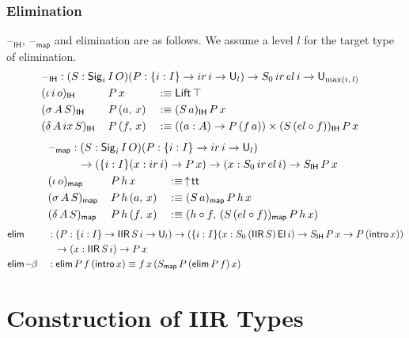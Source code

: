 \documentclass[acmsmall,screen,review,anonymous]{acmart}
\newcommand{\msf}[1]{{\mathsf{#1}}}
\newcommand{\U}{\msf{U}}
\newcommand{\El}{\msf{El}}
\newcommand{\Lift}{\msf{Lift}}
\newcommand{\lup}{\uparrow}
\newcommand{\Sig}{\msf{Sig}}
\newcommand{\ttt}{\msf{tt}}
\newcommand{\blank}{{\mathord{\hspace{1pt}\text{--}\hspace{1pt}}}}
\newcommand{\ir}{{ir}}
\newcommand{\el}{{el}}
\newcommand{\ix}{{ix}}
\newcommand{\intro}{\msf{intro}}
\newcommand{\IH}{\msf{IH}}
\newcommand{\map}{\msf{map}}
\newcommand{\elim}{\msf{elim}}
\newcommand{\IIR}{\msf{IIR}}
\begin{document}
\subsubsection{Elimination}\label{sec:iir-elimination} $\blank_\IH$, $\blank_\map$ and elimination are
as follows. We assume a level $l$ for the target type of elimination.
\begin{alignat*}{3}
  &\rlap{$\blank_\IH : (S : \Sig_i\,I\,O)(P : \{i : I\}\to \ir\,i \to \U_l) \to S_0\,\ir\,\el\,i \to \U_{\max(i,\,l)}$} \\
  &(\iota\,i\,o)_\IH \,&&P\,x       &&:\equiv \Lift\,\top \\
  &(\sigma\,A\,S)_\IH\,&&P\,(a,\,x) &&:\equiv (S\,a)_\IH\,P\,x \\
  &(\delta\,A\,\ix\,S)_\IH\,&&P\,(f,\,x) &&:\equiv ((a : A) \to P\,(f\,a)) \times (S\,(\el \circ f))_\IH\,P\,x
\end{alignat*}
\begin{alignat*}{3}
  &\hspace{-3em}\rlap{$\blank_\map : (S : \Sig_i\,I\,O)(P : \{i : I\}\to \ir\,i \to \U_l)$}\\
  &\hspace{-3em}\rlap{$\hspace{3em}\to (\{i : I\}(x : \ir\,i) \to P\,x) \to (x : S_0\,\ir\,\el\,i) \to S_\IH\,P\,x$} \\
  &\hspace{-3em}(\iota\,o)_\map    \,&&P\,h\,x       &&:\equiv\,\lup\!\ttt \\
  &\hspace{-3em}(\sigma\,A\,S)_\map\,&&P\,h\,(a,\,x) &&:\equiv (S\,a)_\map\,P\,h\,x \\
  &\hspace{-3em}(\delta\,A\,S)_\map\,&&P\,h\,(f,\,x) &&:\equiv (h \circ f,\,(S\,(\el \circ f))_\map\,P\,h\,x)
\end{alignat*}
\begin{alignat*}{3}
  &\elim           &&: (P : \{i : I\}\to \IIR\,S\,i \to \U_l) \to (\{i : I\}(x : S_0\,(\IIR\,S)\,\El\,i) \to S_\IH\,P\,x \to P\,(\intro\,x))\\
  &                && \hspace{0.7em}\to (x : \IIR\,S\,i) \to P\,x \\
  &\elim\!-\!\!\beta &&: \elim\,P\,f\,(\intro\,x) \equiv f\,x\,(S_\map\,P\,(\elim\,P\,f)\,x)
\end{alignat*}

\section{Construction of IIR Types}
\end{document}
